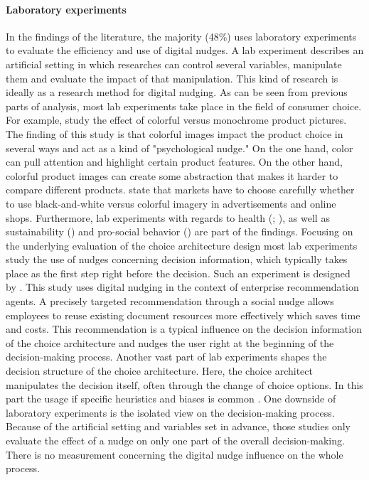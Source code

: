 \paragraph{Laboratory experiments}
In the findings of the literature, the majority (48\%) uses laboratory experiments to evaluate the efficiency and use of digital nudges. A lab experiment describes an artificial setting in which researches can control several variables, manipulate them and evaluate the impact of that manipulation. This kind of research is ideally as a research method for digital nudging. As can be seen from previous parts of analysis, most lab experiments take place in the field of consumer choice. For example, \cite{lee_monochrome_2014} study the effect of colorful versus monochrome product pictures. The finding of this study is that colorful images impact the product choice in several ways and act as a kind of "psychological nudge."
On the one hand, color can pull attention and highlight certain product features. On the other hand, colorful product images can create some abstraction that makes it harder to compare different products. \cite{lee_monochrome_2014} state that markets have to choose carefully whether to use black-and-white versus colorful imagery in advertisements and online shops.
Furthermore, lab experiments with regards to health (\cite{laran_nonconscious_2018}; \cite{langley_should_2015}), as well as sustainability (\cite{bruns_can_2018}) and pro-social behavior (\cite{zarghamee_nudging_2017}) are part of the findings. Focusing on the underlying evaluation of the choice architecture design most lab experiments study the use of nudges concerning decision information, which typically takes place as the first step right before the decision. Such an experiment is designed by \cite{kretzer_designing_2018}. This study uses digital nudging in the context of enterprise recommendation agents. A precisely targeted recommendation through a social nudge allows employees to reuse existing document resources more effectively which saves time and costs. This recommendation is a typical influence on the decision information of the choice architecture and nudges the user right at the beginning of the decision-making process. 
Another vast part of lab experiments shapes the decision structure of the choice architecture. Here, the choice architect manipulates the decision itself, often through the change of choice options. In this part the usage if specific heuristics and biases is common \cite{tversky_judgment_1974}.
One downside of laboratory experiments is the isolated view on the decision-making process. Because of the artificial setting and variables set in advance, those studies only evaluate the effect of a nudge on only one part of the overall decision-making. There is no measurement concerning the digital nudge influence on the whole process.
 
